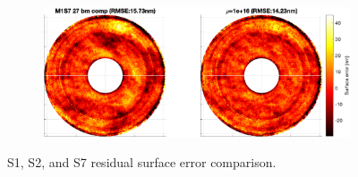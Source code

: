 \documentclass{gmto}
\begin{document}
\begin{figure}[p]
\begin{subfigure}[b]{\textwidth}
\centering
\includegraphics[width=\textwidth]{./pictures/s7_surfaceRMSE.eps}
\end{subfigure}
\caption{\textsf{S1}, \textsf{S2}, and \textsf{S7} residual surface error comparison.}
\label{fig:S1S2S7s_rmse}
\end{figure}
\end{document}
